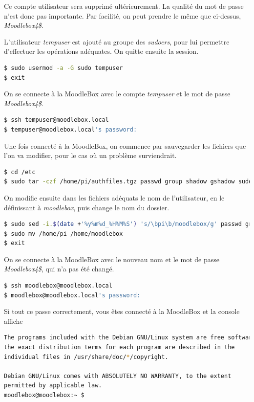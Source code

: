 \documentclass[11pt]{article}
\begin{document}
Ce compte utilisateur sera supprimé ultérieurement. La qualité du mot de passe n'est donc pas importante. Par facilité, on peut prendre le même que ci-dessus, \emph{Moodlebox4\$}.

L'utilisateur \emph{tempuser} est ajouté au groupe des \emph{sudoers}, pour lui permettre d'effectuer les opérations adéquates. On quitte ensuite la session.

\begin{lstlisting}[language=bash]
$ sudo usermod -a -G sudo tempuser
$ exit
\end{lstlisting}

On se connecte à la MoodleBox avec le compte \emph{tempuser} et le mot de passe \emph{Moodlebox4\$}.

\begin{lstlisting}[language=bash]
$ ssh tempuser@moodlebox.local
$ tempuser@moodlebox.local's password:
\end{lstlisting}

Une fois connecté à la MoodleBox, on commence par sauvegarder les fichiers que l'on va modifier, pour le cas où un problème surviendrait.

\begin{lstlisting}[language=bash]
$ cd /etc
$ sudo tar -czf /home/pi/authfiles.tgz passwd group shadow gshadow sudoers systemd/system/autologin@.service
\end{lstlisting}

On modifie ensuite dans les fichiers adéquats le nom de l'utilisateur, en le définissant à \emph{moodlebox}, puis change le nom du dossier.
\begin{lstlisting}[language=bash]
$ sudo sed -i.$(date +'%y%m%d_%H%M%S') 's/\bpi\b/moodlebox/g' passwd group shadow gshadow sudoers systemd/system/autologin@.service
$ sudo mv /home/pi /home/moodlebox
$ exit
\end{lstlisting}

On se connecte à la MoodleBox avec le nouveau nom et le mot de passe \emph{Moodlebox4\$}, qui n'a pas été changé.

\begin{lstlisting}[language=bash]
$ ssh moodlebox@moodlebox.local
$ moodlebox@moodlebox.local's password:
\end{lstlisting}

\begin{verification}
Si tout ce passe correctement, vous êtes connecté à la MoodleBox et la console affiche
\begin{lstlisting}[language=bash]
The programs included with the Debian GNU/Linux system are free software;
the exact distribution terms for each program are described in the
individual files in /usr/share/doc/*/copyright.

Debian GNU/Linux comes with ABSOLUTELY NO WARRANTY, to the extent
permitted by applicable law.
moodlebox@moodlebox:~ $
\end{lstlisting}
\end{verification}
\end{document}
